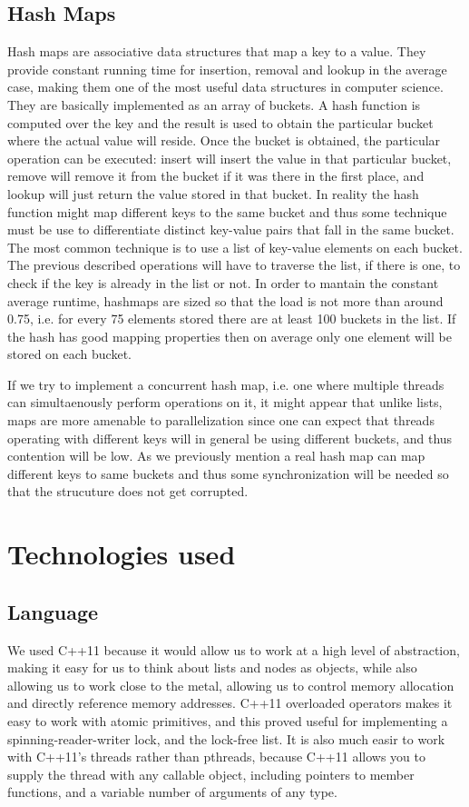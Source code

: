 \documentclass[11pt]{article}
\begin{document}
\subsection{Hash Maps} \label{ssec:bgmap}
Hash maps are associative data structures that map a
key to a value. They provide constant running time for insertion, removal and lookup in the
average case, making them one of the most useful data structures in computer
science. They are basically implemented as an array of buckets. A hash function
is computed over the key and the result is used to obtain the particular bucket
where the actual value will reside. Once the bucket is obtained, the particular
operation can be executed: insert will insert the value in that particular
bucket, remove will remove it from the bucket if it was there in the first
place,  and lookup will just return the value stored in that bucket. In reality
the hash function might map different keys to the same bucket and thus some
technique must be use to differentiate distinct key-value pairs that fall in the
same bucket. The most common technique is to use a list of key-value elements on
each bucket. The previous described operations will have to traverse the list, if
there is one, to check if the key is already in the list or not. In order to
mantain the constant average runtime, hashmaps are sized so that the load is not
more than around 0.75, i.e. for every 75 elements stored there are at least 100 buckets
in the list. If the hash has good mapping properties then on average only one
element will be stored on each bucket.

If we try to implement a concurrent hash map, i.e. one where multiple
threads can simultaenously perform operations on it, it might appear that
unlike lists, maps are more amenable to parallelization since one can expect that
threads operating with different keys will in general be using different buckets, and
thus contention will be low.
As we previously mention a real hash map can map different keys to same buckets
and thus some synchronization will be needed so that the strucuture does not get
corrupted.

\section{Technologies used}
\subsection{Language}
We used C++11 because it would allow us to work at a high level of abstraction,
making it easy for us to think about lists and nodes as objects, while also
allowing us to work close to the metal, allowing us to control memory allocation
and directly reference memory addresses. C++11 overloaded operators makes it
easy to work with atomic primitives, and this proved useful for implementing a
spinning-reader-writer lock, and the lock-free list. It is also much easir to
work with C++11's threads rather than pthreads, because C++11 allows you to
supply the thread with any callable object, including pointers to member
functions, and a variable number of arguments of any type.
\end{document}
